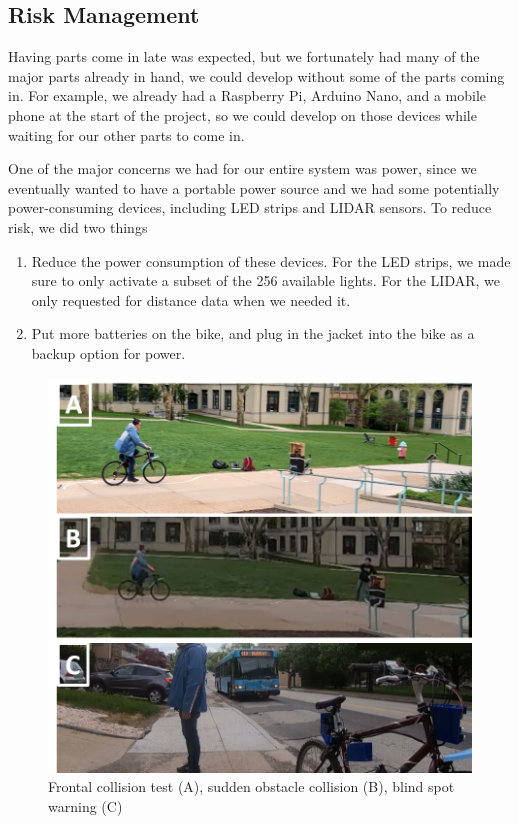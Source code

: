 \documentclass[journal]{IEEEtran}
\begin{document}
\subsection{Risk Management}
Having parts come in late was expected, but we fortunately had many of the major parts already in hand, we could develop without some of the parts coming in. For example, we already had a Raspberry Pi, Arduino Nano, and a mobile phone at the start of the project, so we could develop on those devices while waiting for our other parts to come in. 

One of the major concerns we had for our entire system was power, since we eventually wanted to have a portable power source and we had some potentially power-consuming devices, including LED strips and LIDAR sensors. To reduce risk, we did two things
\begin{enumerate}
    \item Reduce the power consumption of these devices. For the LED strips, we made sure to only activate a subset of the 256 available lights. For the LIDAR, we only requested for distance data when we needed it.
    \item Put more batteries on the bike, and plug in the jacket into the bike as a backup option for power.
\end{enumerate}

\begin{figure}
    \centering
    \includegraphics[width=\columnwidth]{images/blind_collision_tests.png}
    \caption{Frontal collision test (A), sudden obstacle collision (B), blind spot warning (C)}
    \label{fig:collision_blind}
\end{figure}
\end{document}
